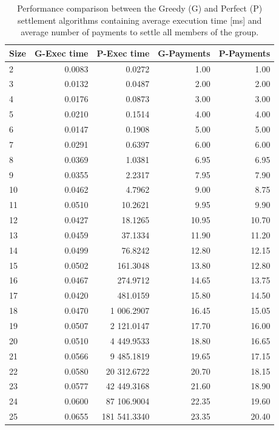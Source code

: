 \documentclass{ctuthesis}
\begin{document}
\begin{table}[htbp]
\centering
\caption{Performance comparison between the Greedy (G) and Perfect (P) settlement algorithms containing average execution time [ms] and average number of payments to settle all members of the group.}
\label{table:performance_comparison}
\begin{tabular}{|l|r|r|r|r|}
\hline
\textbf{Size} & \textbf{G-Exec time} & \textbf{P-Exec time} & \textbf{G-Payments} & \textbf{P-Payments} \\
\hline
2  & 0.0083 & 0.0272     & 1.00  & 1.00  \\
3  & 0.0132 & 0.0487     & 2.00  & 2.00  \\
4  & 0.0176 & 0.0873     & 3.00  & 3.00  \\
5  & 0.0210 & 0.1514     & 4.00  & 4.00  \\
6  & 0.0147 & 0.1908     & 5.00  & 5.00  \\
7  & 0.0291 & 0.6397     & 6.00  & 6.00  \\
8  & 0.0369 & 1.0381     & 6.95  & 6.95  \\
9  & 0.0355 & 2.2317     & 7.95  & 7.90  \\
10 & 0.0462 & 4.7962     & 9.00  & 8.75  \\
11 & 0.0510 & 10.2621    & 9.95  & 9.90  \\
12 & 0.0427 & 18.1265    & 10.95 & 10.70 \\
13 & 0.0459 & 37.1334    & 11.90 & 11.20 \\
14 & 0.0499 & 76.8242    & 12.80 & 12.15 \\
15 & 0.0502 & 161.3048   & 13.80 & 12.80 \\
16 & 0.0467 & 274.9712   & 14.65 & 13.75 \\
17 & 0.0420 & 481.0159   & 15.80 & 14.50 \\
18 & 0.0470 & 1 006.2907 & 16.45 & 15.05 \\
19 & 0.0507 & 2 121.0147 & 17.70 & 16.00 \\
20 & 0.0510 & 4 449.9533 & 18.80 & 16.65 \\
21 & 0.0566 & 9 485.1819 & 19.65 & 17.15 \\
22 & 0.0580 & 20 312.6722 & 20.70 & 18.15 \\
23 & 0.0577 & 42 449.3168 & 21.60 & 18.90 \\     
24 & 0.0600 & 87 106.9004 & 22.35 & 19.60 \\
25 & 0.0655 & 181 541.3340 & 23.35 & 20.40 \\ 
\hline
\end{tabular}
\end{table}
\end{document}

